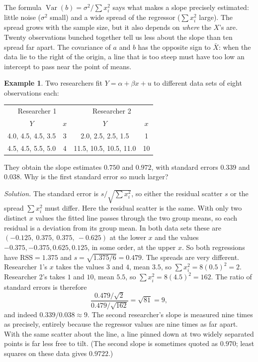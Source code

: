 \documentclass[11pt,a4paper]{article}
\numberwithin{equation}{section}
\DeclareMathOperator{\Var}{Var}
\theoremstyle{definition}
\newtheorem{exa}[thm]{Example}
\begin{document}
The formula $\Var(b) = \sigma^2/\sum x_i^2$ says what makes a slope precisely estimated: little noise ($\sigma^2$ small) and a wide spread of the
regressor ($\sum x_i^2$ large). The spread grows with the sample size, but it also depends on \emph{where} the $X$'s are. Twenty observations bunched
together tell us less about the slope than ten spread far apart. The covariance of $a$ and $b$ has the opposite sign to $\bar X$: when the data lie
to the right of the origin, a line that is too steep must have too low an intercept to pass near the point of means.

\begin{exa}
\label{ex:researchers}
Two researchers fit $Y = \alpha + \beta x + u$ to different data sets of eight observations each:
\begin{center}
\begin{tabular}{cc@{\qquad}cc}
\multicolumn{2}{c}{Researcher 1} & \multicolumn{2}{c}{Researcher 2}\\
$Y$ & $x$ & $Y$ & $x$\\\hline
4.0, 4.5, 4.5, 3.5 & 3 & 2.0, 2.5, 2.5, 1.5 & 1\\
4.5, 4.5, 5.5, 5.0 & 4 & 11.5, 10.5, 10.5, 11.0 & 10
\end{tabular}
\end{center}
They obtain the slope estimates $0.750$ and $0.972$, with standard errors $0.339$ and $0.038$. Why is the first standard error so much larger?

\emph{Solution.} The standard error is $s/\sqrt{\sum x_i^2}$, so either the residual scatter $s$ or the spread $\sum x_i^2$ must differ. Here the
residual scatter is the same. With only two distinct $x$ values the fitted line passes through the two group means, so each residual is a
deviation from its group mean. In both data sets these are $(-0.125,\ 0.375,\ 0.375,\ -0.625)$ at the lower $x$ and the values
$-0.375, -0.375, 0.625, 0.125$, in some order, at the upper $x$. So both regressions have $\text{RSS} = 1.375$ and $s = \sqrt{1.375/6} = 0.479$. The spreads are very
different. Researcher 1's $x$ takes the values $3$ and $4$, mean $3.5$, so $\sum x_i^2 = 8(0.5)^2 = 2$. Researcher 2's takes $1$ and $10$, mean
$5.5$, so $\sum x_i^2 = 8(4.5)^2 = 162$. The ratio of standard errors is therefore
\[
\frac{0.479/\sqrt{2}}{0.479/\sqrt{162}} = \sqrt{81} = 9,
\]
and indeed $0.339/0.038 \approx 9$. The second researcher's slope is measured nine times as precisely, entirely because the regressor values are
nine times as far apart. With the same scatter about the line, a line pinned down at two widely separated points is far less free to tilt.
(The second slope is sometimes quoted as $0.970$; least squares on these data gives $0.9722$.)
\end{exa}
\end{document}
